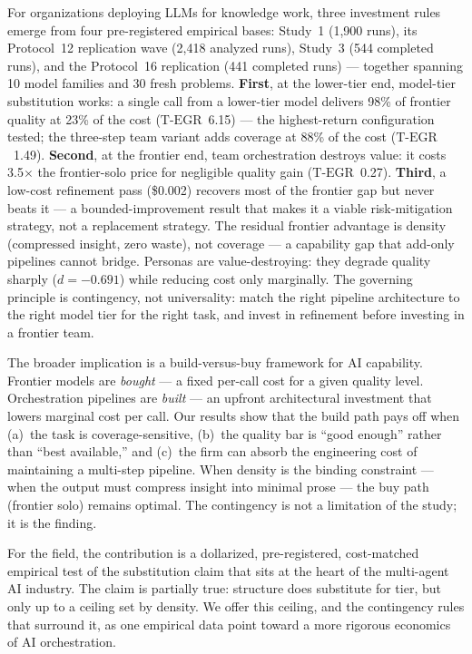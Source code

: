 \documentclass[12pt,a4paper]{article}
\newcommand{\TEGR}{\ensuremath{\text{T-EGR}}}
\begin{document}
For organizations deploying LLMs for knowledge work, three investment rules
emerge from four pre-registered empirical bases: Study~1 (1{,}900 runs), its
Protocol~12 replication wave (2{,}418 analyzed runs), Study~3 (544 completed
runs), and the Protocol~16 replication (441 completed runs) --- together
spanning 10 model families and 30 fresh problems. \textbf{First}, at the lower-tier end,
model-tier substitution works: a single call from a lower-tier model
delivers 98\% of frontier quality at 23\% of the cost ($\TEGR$~6.15) --- the
highest-return configuration tested; the three-step team variant adds coverage
at 88\% of the cost ($\TEGR$~1.49). \textbf{Second}, at the frontier end, team
orchestration destroys value: it costs 3.5$\times$ the frontier-solo price for
negligible quality gain ($\TEGR$~0.27). \textbf{Third}, a low-cost refinement pass
(\$0.002) recovers most of the frontier gap but never beats it --- a
bounded-improvement result that makes it a viable risk-mitigation strategy, not
a replacement strategy. The residual frontier advantage is density (compressed
insight, zero waste), not coverage --- a capability gap that add-only pipelines
cannot bridge. Personas are value-destroying: they degrade quality sharply
($d = -0.691$) while reducing cost only marginally. The governing principle is contingency, not universality: match the
right pipeline architecture to the right model tier for the right task, and
invest in refinement before investing in a frontier team.

The broader implication is a build-versus-buy framework for AI capability.
Frontier models are \emph{bought} --- a fixed per-call cost for a given quality
level. Orchestration pipelines are \emph{built} --- an upfront architectural
investment that lowers marginal cost per call. Our results show that the build
path pays off when (a)~the task is coverage-sensitive, (b)~the quality bar is
``good enough'' rather than ``best available,'' and (c)~the firm can absorb the
engineering cost of maintaining a multi-step pipeline. When density is the
binding constraint --- when the output must compress insight into minimal prose
--- the buy path (frontier solo) remains optimal. The contingency is not a
limitation of the study; it is the finding.

For the field, the contribution is a dollarized, pre-registered, cost-matched
empirical test of the substitution claim that sits at the heart of the
multi-agent AI industry. The claim is partially true: structure does substitute
for tier, but only up to a ceiling set by density. We offer this ceiling, and
the contingency rules that surround it, as one empirical data point toward a
more rigorous economics of AI orchestration.
\end{document}
